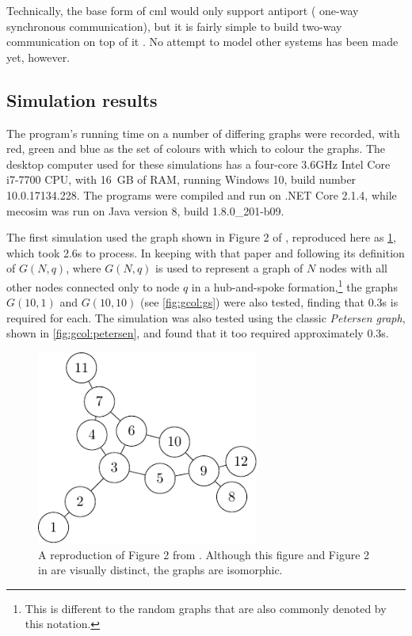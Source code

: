 Technically, the base form of \gls{cml} would only support antiport (\ie{} one-way synchronous communication), but it is fairly simple to build two-way communication on top of it \cite[ch.~6]{Reppy2007}.  No attempt to model other systems has been made yet, however.

\subsection{Simulation results}
The program's running time on a number of differing graphs were recorded, with red, green and blue as the set of colours with which to colour the graphs.  The desktop computer used for these simulations has a four-core 3.6GHz Intel Core i7-7700 CPU, with 16 GB of RAM, running Windows 10, build number 10.0.17134.228.  The \fsharp{} programs were compiled and run on .NET Core 2.1.4, while \gls{mecosim} was run on Java version 8, build 1.8.0\_201-b09. 

The first simulation used the graph shown in Figure 2 of \cite{Gheorghe2013}, reproduced here as \cref{fig:gcol:gheorghefig2}, which took 2.6s to process.  In keeping with that paper and following its definition of \(G(N,q)\), where \(G(N,q)\) is used to represent a graph of \(N\) nodes with all other nodes connected only to node \(q\) in a hub-and-spoke formation,\footnote{This is different to the random graphs that are also commonly denoted by this notation.} the graphs \(G(10,1)\) and \(G(10,10)\) (see \cref{fig:gcol:gs}) were also tested, finding that 0.3s is required for each.  The simulation was also tested using the classic \emph{Petersen graph}, shown in \cref{fig:gcol:petersen}, and found that it too required approximately 0.3s.

\begin{figure}
    \centering
    \includegraphics[width=0.65\textwidth]{chapters/gcol/figs/gheorghe-figure-2-figure0.pdf}
    \caption[A reproduction of the graph in Figure 2 of \cite{Gheorghe2013}]{\label{fig:gcol:gheorghefig2}A reproduction of Figure 2 from \cite{Gheorghe2013}.  Although this figure and Figure 2 in \cite{Gheorghe2013} are visually distinct, the graphs are isomorphic.}
\end{figure}

